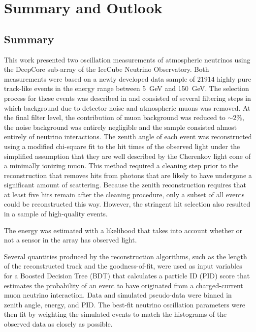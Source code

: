 \setchapterpreamble[u]{\margintoc}
\chapter{Summary and Outlook}

\section{Summary}
\label{sec:summary}

This work presented two oscillation measurements of atmospheric neutrinos using the DeepCore sub-array of the IceCube Neutrino Observatory.
Both measurements were based on a newly developed data sample of \num{21914} highly pure track-like events in the energy range between \SI{5}{\giga\electronvolt} and \SI{150}{\giga\electronvolt}.
The selection process for these events was described in  and consisted of several filtering steps in which background due to detector noise and atmospheric muons was removed.
At the final filter level, the contribution of muon background was reduced to $\sim2\%$, the noise background was entirely negligible and the sample consisted almost entirely of neutrino interactions.
The zenith angle of each event was reconstructed using a modified chi-square fit to the hit times of the observed light under the simplified assumption that they are well described by the Cherenkov light cone of a minimally ionizing muon.
This method required a cleaning step prior to the reconstruction that removes hits from photons that are likely to have undergone a significant amount of scattering.
Because the zenith reconstruction requires that at least five hits remain after the cleaning procedure, only a subset of all events could be reconstructed this way.
However, the stringent hit selection also resulted in a sample of high-quality events.

The energy was estimated with a likelihood that takes into account whether or not a sensor in the array has observed light.

Several quantities produced by the reconstruction algorithms, such as the length of the reconstructed track and the goodness-of-fit, were used as input variables for a Boosted Decision Tree (BDT) that calculates a particle ID (PID) score that estimates the probability of an event to have originated from a charged-current muon neutrino interaction.
Data and simulated pseudo-data were binned in zenith angle, energy, and PID.
The best-fit neutrino oscillation parameters were then fit by weighting the simulated events to match the histograms of the observed data as closely as possible.

